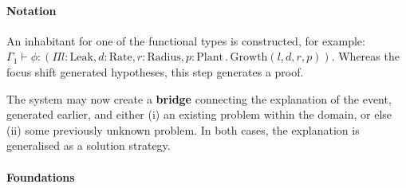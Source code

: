 \paragraph{\textbf{\upshape Notation}}

An inhabitant for one of the functional types is constructed, for
example: $\Gamma_1 \vdash \phi : (\Pi l:\mathrm{Leak},
d:\mathrm{Rate}, r:\mathrm{Radius}, p:\mathrm{Plant} \mathbin{.}
\mathrm{Growth}(l,d,r,p))$.  Whereas the focus shift generated
hypotheses, this step generates a proof.

\begin{center}
\asterism
\end{center}

\begin{defn}\label{def:bridge}
\hypertarget{def:bridge}{}The system may now create a \textbf{bridge}
connecting the explanation of the event, generated earlier, and either
(i) an existing problem within the domain, or else (ii) some
previously unknown problem.  In both cases, the explanation is
generalised as a solution strategy.
\end{defn}
\paragraph{\textbf{\upshape Foundations}}
                                         
